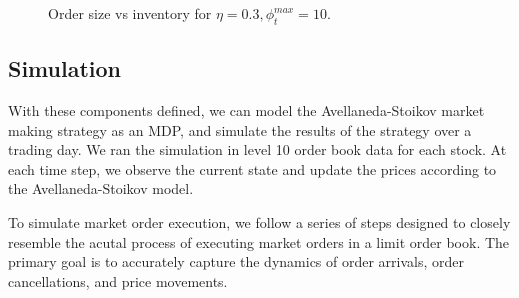 \documentclass[letterpaper, 10 pt, conference]{ieeeconf}  %
\begin{document}
\begin{figure}
        \centering
        \caption{Order size vs inventory for $\eta=0.3, \phi_t^{max} = 10$.}
        \label{fig:order_size_vs_inventory}
\end{figure}

\subsection{Simulation}
With these components defined, we can model the Avellaneda-Stoikov market making strategy as an MDP, and simulate the results of the strategy over a trading day. We ran the simulation in level 10 order book data for each stock. At each time step, we observe the current state and update the prices according to the Avellaneda-Stoikov model.

To simulate market order execution, we follow a series of steps designed to closely resemble the acutal process of executing market orders in a limit order book. The primary goal is to accurately capture the dynamics of order arrivals, order cancellations, and price movements. 
\end{document}
